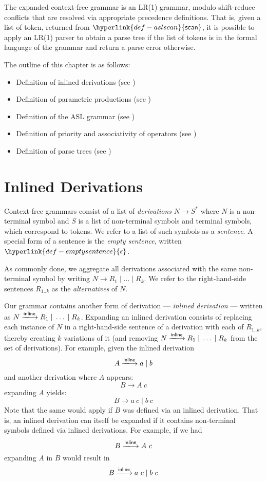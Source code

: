 \documentclass{book}
\newcommand\emptysentence[0]{\hyperlink{def-emptysentence}{\epsilon}}
\newcommand\derives[0]{\longrightarrow}
\newcommand\derivesinline[0]{\xlongrightarrow{\textsf{inline}}}
\newcommand\parsesep[0]{\ } %
\newcommand\aslscan[0]{\hyperlink{def-aslscan}{\textsf{scan}}}
\begin{document}
The expanded context-free grammar is an LR(1) grammar, modulo shift-reduce
conflicts that are resolved via appropriate precedence definitions.
That is, given a list of token, returned from $\aslscan$, it is possible to apply
an LR(1) parser to obtain a parse tree if the list of tokens is in the formal language
of the grammar and return a parse error otherwise.

The outline of this chapter is as follows:
\begin{itemize}
  \item Definition of inlined derivations (see )
  \item Definition of parametric productions (see )
  \item Definition of the ASL grammar (see )
  \item Definition of priority and associativity of operators (see )
  \item Definition of parse trees (see )
\end{itemize}

\section{Inlined Derivations \label{sec:InlinedDerivations}}
Context-free grammars consist of a list of \emph{derivations} $N \derives S^*$
where $N$ is a non-terminal symbol and $S$ is a list of non-terminal symbols and terminal symbols,
which correspond to tokens.
We refer to a list of such symbols as a \emph{sentence}.
A special form of a sentence is the \emph{empty sentence}, written $\emptysentence$.

As commonly done, we aggregate all derivations associated with the same non-terminal symbol
by writing $N \derives R_1 \;|\; \ldots \;|\; R_k$.
We refer to the right-hand-side sentences $R_{1..k}$ as the \emph{alternatives} of $N$.

Our grammar contains another form of derivation --- \emph{inlined derivation} ---
written as $N \derivesinline R_1 \;|\; \ldots \;|\; R_k$.
Expanding an inlined derivation consists of replacing each instance of $N$
in a right-hand-side sentence of a derivation with each of $R_{1..k}$, thereby
creating $k$ variations of it (and removing $N \derivesinline R_1 \;|\; \ldots \;|\; R_k$
from the set of derivations).
For example, given the inlined derivation
\[
  A \derivesinline a \;|\; b
\]
and another derivation where $A$ appears:
\[
B \derives A \parsesep c
\]
expanding $A$ yields:
\[
B \derives a \parsesep c \;|\; b \parsesep c
\]
Note that the same would apply if $B$ was defined via an inlined derivation.
That is, an inlined derivation can itself be expanded if it contains non-terminal
symbols defined via inlined derivations.
For example, if we had
\[
B \derivesinline A \parsesep c
\]
expanding $A$ in $B$ would result in
\[
B \derivesinline a \parsesep c \;|\; b \parsesep c
\]
\end{document}
